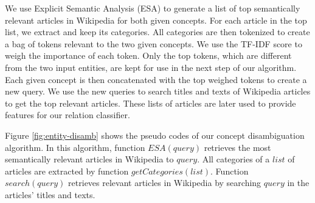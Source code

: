 We use Explicit Semantic Analysis (ESA) \cite{GabrilovichMa07} to
generate a list of top semantically relevant articles in Wikipedia for both given
concepts. For each article in the top list, we extract and keep its
categories. All categories are then tokenized to create a bag of
tokens relevant to the two given concepts.  We use the TF-IDF score to
weigh the importance of each token. Only the top tokens, which
are different from the two input entities, are kept for use in the next
step of our algorithm. 
Each given concept is then concatenated with the top weighed tokens
to create a new query. We use the new queries to search titles and
texts of Wikipedia articles to get the top relevant articles. These
lists of articles are later used to provide features for our relation
classifier.

Figure \ref{fig:entity-disamb} shows the pseudo codes of our concept
disambiguation algorithm. In this algorithm, function $ESA(query)$
retrieves the most semantically relevant articles in Wikipedia to
$query$. All categories of a $list$ of articles are extracted by
function $getCategories(list)$. Function $search(query)$ retrieves
relevant articles in Wikipedia by searching $query$ in the articles'
titles and texts. 

